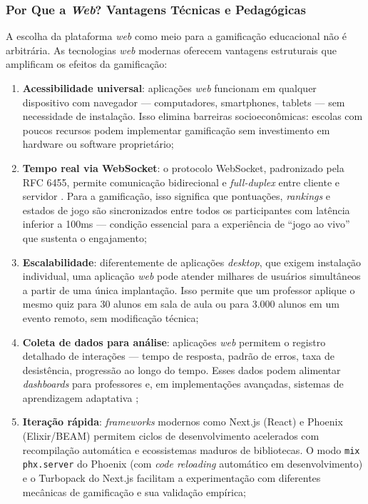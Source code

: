 \documentclass[
	12pt,
	openany,
	oneside,
	a4paper,
	english,
	brazil
]{abntex2}
\begin{document}
\subsubsection{Por Que a \textit{Web}? Vantagens Técnicas e Pedagógicas}

A escolha da plataforma \textit{web} como meio para a gamificação educacional não é arbitrária. As tecnologias \textit{web} modernas oferecem vantagens estruturais que amplificam os efeitos da gamificação:

\begin{enumerate}
  \item \textbf{Acessibilidade universal}: aplicações \textit{web} funcionam em qualquer dispositivo com navegador --- computadores, smartphones, tablets --- sem necessidade de instalação. Isso elimina barreiras socioeconômicas: escolas com poucos recursos podem implementar gamificação sem investimento em hardware ou software proprietário;

  \item \textbf{Tempo real via WebSocket}: o protocolo WebSocket, padronizado pela RFC 6455, permite comunicação bidirecional e \textit{full-duplex} entre cliente e servidor \cite{lubbers2010}. Para a gamificação, isso significa que pontuações, \textit{rankings} e estados de jogo são sincronizados entre todos os participantes com latência inferior a 100ms --- condição essencial para a experiência de ``jogo ao vivo'' que sustenta o engajamento;

  \item \textbf{Escalabilidade}: diferentemente de aplicações \textit{desktop}, que exigem instalação individual, uma aplicação \textit{web} pode atender milhares de usuários simultâneos a partir de uma única implantação. Isso permite que um professor aplique o mesmo quiz para 30 alunos em sala de aula ou para 3.000 alunos em um evento remoto, sem modificação técnica;

  \item \textbf{Coleta de dados para análise}: aplicações \textit{web} permitem o registro detalhado de interações --- tempo de resposta, padrão de erros, taxa de desistência, progressão ao longo do tempo. Esses dados podem alimentar \textit{dashboards} para professores e, em implementações avançadas, sistemas de aprendizagem adaptativa \cite{brusilovsky2007};

  \item \textbf{Iteração rápida}: \textit{frameworks} modernos como Next.js (React) e Phoenix (Elixir/BEAM) permitem ciclos de desenvolvimento acelerados com recompilação automática e ecossistemas maduros de bibliotecas. O modo \texttt{mix phx.server} do Phoenix (com \textit{code reloading} automático em desenvolvimento) e o Turbopack do Next.js facilitam a experimentação com diferentes mecânicas de gamificação e sua validação empírica;


\end{enumerate}
\end{document}

